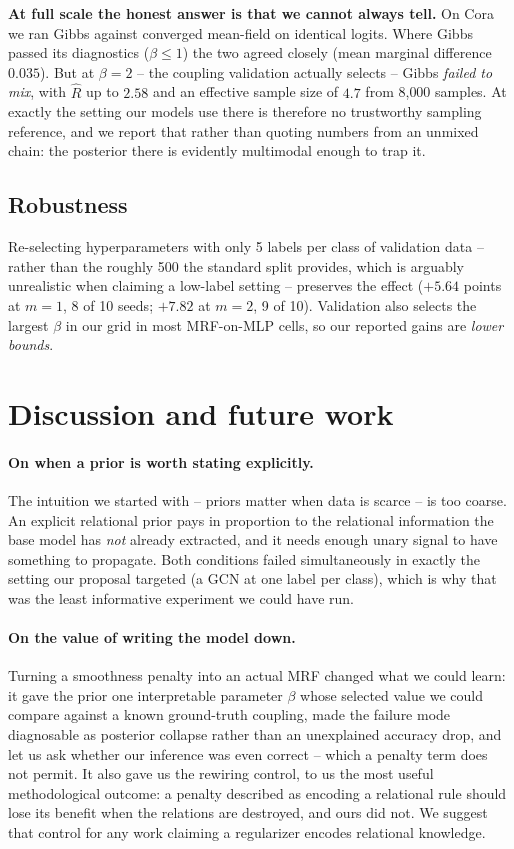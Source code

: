 \documentclass{article}
\begin{document}
\textbf{At full scale the honest answer is that we cannot always tell.} On Cora we ran Gibbs
against converged mean-field on identical logits. Where Gibbs passed its diagnostics
($\beta\le1$) the two agreed closely (mean marginal difference $0.035$). But at $\beta=2$ -- the
coupling validation actually selects -- Gibbs \emph{failed to mix}, with $\hat{R}$ up to $2.58$
and an effective sample size of $4.7$ from 8{,}000 samples. At exactly the setting our models use
there is therefore no trustworthy sampling reference, and we report that rather than quoting
numbers from an unmixed chain: the posterior there is evidently multimodal enough to trap it.

\subsection{Robustness}

Re-selecting hyperparameters with only 5 labels per class of validation data -- rather than the
roughly 500 the standard split provides, which is arguably unrealistic when claiming a low-label
setting -- preserves the effect ($+5.64$ points at $m{=}1$, 8 of 10 seeds; $+7.82$ at $m{=}2$,
9 of 10). Validation also selects the largest $\beta$ in our grid in most MRF-on-MLP cells, so
our reported gains are \emph{lower bounds}.

\section{Discussion and future work}

\paragraph{On when a prior is worth stating explicitly.} The intuition we started with -- priors
matter when data is scarce -- is too coarse. An explicit relational prior pays in proportion to
the relational information the base model has \emph{not} already extracted, and it needs enough
unary signal to have something to propagate. Both conditions failed simultaneously in exactly the
setting our proposal targeted (a GCN at one label per class), which is why that was the least
informative experiment we could have run.

\paragraph{On the value of writing the model down.} Turning a smoothness penalty into an actual
MRF changed what we could learn: it gave the prior one interpretable parameter $\beta$ whose
selected value we could compare against a known ground-truth coupling, made the failure mode
diagnosable as posterior collapse rather than an unexplained accuracy drop, and let us ask
whether our inference was even correct -- which a penalty term does not permit. It also gave us
the rewiring control, to us the most useful methodological outcome: a penalty described as
encoding a relational rule should lose its benefit when the relations are destroyed, and ours did
not. We suggest that control for any work claiming a regularizer encodes relational knowledge.
\end{document}
